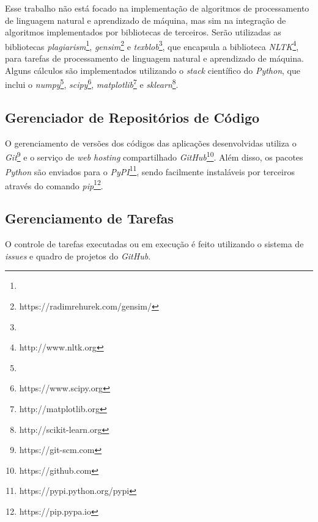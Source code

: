 Esse trabalho não está focado na implementação de algoritmos de processamento de linguagem natural e aprendizado de máquina, mas sim na integração de algoritmos implementados por bibliotecas de terceiros. Serão utilizadas as bibliotecas \textit{plagiarism}\footnote{}, \textit{gensim}\footnote{https://radimrehurek.com/gensim/} e \textit{texblob}\footnote{}, que encapsula a biblioteca \textit{NLTK}\footnote{http://www.nltk.org}, para tarefas de processamento de linguagem natural e aprendizado de máquina. Alguns cálculos são implementados utilizando o \textit{stack} científico do \textit{Python}, que inclui o \textit{numpy}\footnote{}, \textit{scipy}\footnote{https://www.scipy.org}, \textit{matplotlib}\footnote{http://matplotlib.org} e \textit{sklearn}\footnote{http://scikit-learn.org}.

\subsection{Gerenciador de Repositórios de Código}

O gerenciamento de versões dos códigos das aplicações desenvolvidas utiliza o \textit{Git}\footnote{https://git-scm.com} e o serviço de \textit{web hosting} compartilhado \textit{GitHub}\footnote{https://github.com}. Além disso, os pacotes \textit{Python} são enviados para o \textit{PyPI}\footnote{https://pypi.python.org/pypi}, sendo facilmente instaláveis por terceiros através do comando \textit{pip}\footnote{https://pip.pypa.io}.


\subsection{Gerenciamento de Tarefas}

O controle de tarefas executadas ou em execução é feito utilizando o sistema de \textit{issues} e quadro de projetos do \textit{GitHub}.


